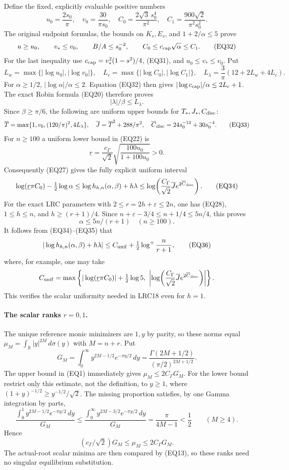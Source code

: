 Define the fixed, explicitly evaluable positive numbers
\[
 u_0=\frac{2s_0}{\pi},\quad v_0=\frac{30}{\pi s_0},\quad
 C_0=\frac{2\sqrt3\,s_0^4}{\pi^2},\quad
 C_1=\frac{900\sqrt2}{\pi^2s_0^2}.
\]
The original endpoint formulas, the bounds on \(K_s,E_s\), and
\(1+2/\alpha\le5\) prove
\[
 u\ge u_0,\qquad v_*\le v_0,\qquad
 B/A\le s_0^{-2},\qquad
 C_0\le c_{\rm cap}\sqrt\alpha\le C_1 .
\tag{EQ32}
\]
For the last inequality use
\(c_{\rm cap}=v_*^2(1-s^2)/4\), (EQ31), and
\(u_0\le v_*\le v_0\).
Put
\[
 L_w=\max\{|\log u_0|,|\log v_0|\},\quad
 L_c=\max\{|\log C_0|,|\log C_1|\},\quad
 L_\lambda=\frac3\pi(12+2L_w+4L_c).
\]
For \(\alpha\ge1/2\),
\(|\log\alpha|/\alpha\le2\).  Equation (EQ32) then gives
\(|\log c_{\rm cap}|/\alpha\le2L_c+1\).
The exact Robin formula (EQ20) therefore proves
\[
 |\lambda|/\beta\le L_\lambda.
\]
Since \(\beta\ge\pi/6\), the following are uniform upper bounds for
\(T_*,J_*,C_{\rm disc}\):
\[
 \overline T=\max\{1,v_0,(120/\pi)^2,4L_\lambda\},\quad
 \overline J=\overline T^2+288/\pi^2,\quad
 \overline C_{\rm disc}=24s_0^{-12}+30s_0^{-4}.
\tag{EQ33}
\]
For \(n\ge100\) a uniform lower bound in (EQ22) is
\[
 \underline r=\frac{c_\Gamma}{\sqrt2}
             \sqrt{\frac{100u_0}{1+100u_0}}>0.
\]
Consequently (EQ27) gives the fully explicit uniform interval
\[
 \log(\underline r\pi C_0)-\tfrac12\log\alpha
 \le\log h_{h,n}(\alpha,\beta)+h\lambda
 \le\log\!\left(
      \frac{C_\Gamma}{\sqrt2}\overline J
      e^{2\overline C_{\rm disc}}\right).
\tag{EQ34}
\]
For the exact LRC parameters with \(2\le r=2h+\varepsilon\le2n\),
one has (EQ28), \(1\le h\le n\), and \(h\ge(r+1)/4\).
Since \(n+\varepsilon-3/4\le n+1/4\le5n/4\), this proves
\[
 \alpha\le5n/(r+1)\quad(n\ge100).
\tag{EQ35}
\]
It follows from (EQ34)--(EQ35) that
\[
 |\log h_{h,n}(\alpha,\beta)+h\lambda|
 \le C_{\rm unif}+\tfrac12\log^+\frac{n}{r+1},
\tag{EQ36}
\]
where, for example, one may take
\[
 C_{\rm unif}=\max\left\{
 |\log(\underline r\pi C_0)|+\tfrac12\log5,\
 \left|\log\!\left(\frac{C_\Gamma}{\sqrt2}\overline J
               e^{2\overline C_{\rm disc}}\right)\right|
 \right\}.
\]
This verifies the scalar uniformity needed in LRC18 even for \(h=1\).

\paragraph{The scalar ranks \(r=0,1\).}
The unique reference monic minimizers are \(1,y\) by parity, so these
norms equal \(\mu_M=\int_{\mathbb R}|y|^{2M}\,d\sigma(y)\) with
\(M=n+r\).  Put
\[
 G_M=\int_0^\infty y^{2M-1/2}e^{-\pi y/2}\,dy
     =\frac{\Gamma(2M+1/2)}{(\pi/2)^{2M+1/2}}.
\]
The upper bound in (EQ1) immediately gives \(\mu_M\le2C_\Gamma G_M\).
For the lower bound restrict only this estimate, not the definition,
to \(y\ge1\), where
\((1+y)^{-1/2}\ge y^{-1/2}/\sqrt2\).
The missing proportion satisfies, by one Gamma integration by parts,
\[
 \frac{\int_0^1 y^{2M-1/2}e^{-\pi y/2}\,dy}{G_M}
 \le \frac{\int_0^\infty y^{2M-3/2}e^{-\pi y/2}\,dy}{G_M}
 =\frac{\pi}{4M-1}<\frac12\qquad(M\ge4).
\]
Hence
\[
 (c_\Gamma/\sqrt2)G_M\le\mu_M\le2C_\Gamma G_M.
\tag{EQ37}
\]
The actual-root scalar minima are then compared by (EQ13), so these
ranks need no singular equilibrium substitution.
